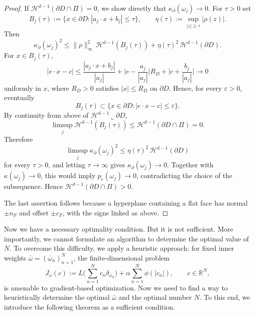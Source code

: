 \documentclass[11pt]{amsart}
\theoremstyle{definition}
\theoremstyle{remark}
\begin{document}
\begin{proof}
If $\mathcal{H}^{d-1}(\partial D\cap\Pi)=0$, we show directly that
$\kappa_\partial(\omega_j)\to0$. For $\tau>0$ set
\begin{equation*}
	B_j(\tau):=\{x\in\partial D:|a_j\cdot x+b_j|\le\tau\},
	\qquad
	\eta(\tau):=\sup_{|z|\ge\tau}|\rho(z)|.
\end{equation*}
Then
\begin{equation*}
	\kappa_\partial(\omega_j)^2
	\le
	\|\rho\|_\infty^2\,\mathcal{H}^{d-1}(B_j(\tau))
	+
	\eta(\tau)^2\,\mathcal{H}^{d-1}(\partial D).
\end{equation*}
For $x\in B_j(\tau)$,
\begin{equation*}
	|e\cdot x-c|
	\le
	\frac{|a_j\cdot x+b_j|}{|a_j|}
	+
	\Big|e-\frac{a_j}{|a_j|}\Big|R_D
	+
	\Big|c+\frac{b_j}{|a_j|}\Big|
	\to0
\end{equation*}
uniformly in $x$, where $R_D>0$ satisfies $|x|\le R_D$ on $\partial D$.
Hence, for every $\varepsilon>0$, eventually
\begin{equation*}
	B_j(\tau)\subset\{x\in\partial D:|e\cdot x-c|\le\varepsilon\}.
\end{equation*}
By continuity from above of
$\mathcal{H}^{d-1}\llcorner\partial D$,
\begin{equation*}
	\limsup_j\mathcal{H}^{d-1}(B_j(\tau))
	\le
	\mathcal{H}^{d-1}(\partial D\cap\Pi)=0.
\end{equation*}
Therefore
\begin{equation*}
	\limsup_j\kappa_\partial(\omega_j)^2
	\le
	\eta(\tau)^2\,\mathcal{H}^{d-1}(\partial D)
\end{equation*}
for every $\tau>0$, and letting $\tau\to\infty$ gives
$\kappa_\partial(\omega_j)\to0$. Together with $\kappa(\omega_j)\to0$, this
would imply $p_r(\omega_j)\to0$, contradicting the choice of the subsequence.
Hence $\mathcal{H}^{d-1}(\partial D\cap\Pi)>0$.

The last assertion follows because a hyperplane containing a flat face has
normal $\pm n_F$ and offset $\pm c_F$, with the signs linked as above.
\end{proof}


Now we have a necessary optimality condition. But it is not sufficient. More importantly, we cannot formulate an algorithm to determine the optimal value of $N$. To overcome this difficulty, we apply a heuristic approach: for fixed inner weights $\bar{\omega} = (\bar{\omega}_n)_{n = 1}^N$, the finite-dimensional problem
\begin{equation}\label{opt_fixN}
	J_{\bar{\omega}}(c):= L\bigg( \sum_{n = 1}^N c_n \delta_{\bar{\omega}_n} \bigg) + \alpha \sum_{n = 1}^N \phi(|c_n|), \qquad c \in \mathbb{R}^N,
\end{equation}
is amenable to gradient-based optimization. Now we need to find a way to heuristically determine the optimal $\bar{\omega}$ and the optimal number $N$. To this end, we introduce the following theorem as a sufficient condition.
\end{document}
